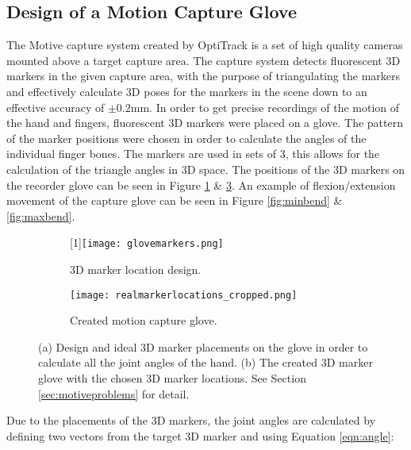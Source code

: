 \documentclass[../main.tex]{subfiles}
\begin{document}
\subsection{Design of a Motion Capture Glove}
\label{sec:motiveglove}

The Motive capture system created by OptiTrack \cite{motive} is a set of high quality cameras mounted above a target capture area.
The capture system detects fluorescent 3D markers in the given capture area, with the purpose of triangulating the markers and effectively calculate 3D poses for the markers in the scene down to an effective accuracy of $\pm 0.2$mm.
In order to get precise recordings of the motion of the hand and fingers, fluorescent 3D markers were placed on a glove.
The pattern of the marker positions were chosen in order to calculate the angles of the individual finger bones.
The markers are used in sets of 3, this allows for the calculation of the triangle angles in 3D space.
The positions of the 3D markers on the recorder glove can be seen in Figure \ref{fig:markerdesign} \& \ref{fig:realmarkers}.
An example of \gls{flexion/extension} movement of the capture glove can be seen in Figure \ref{fig:minbend} \& \ref{fig:maxbend}.


\begin{figure}[H]
    \centering
    \begin{subfigure}[b]{0.49\textwidth}
        \centering
        \scalebox{-1}[1]{\texttt{[image: glovemarkers.png]}}
        \caption{3D marker location design.}
        \label{fig:markerdesign}
    \end{subfigure}
    \hfill
    \centering
    \begin{subfigure}[b]{0.49\textwidth}
        \centering
        \texttt{[image: realmarkerlocations\_cropped.png]}
        \caption{Created motion capture glove.}
        \label{fig:realmarkers}
    \end{subfigure}
    \caption{(a) Design and ideal 3D marker placements on the glove in order to calculate all the joint angles of the hand. (b) The created 3D marker glove with the chosen 3D marker locations. See Section \ref{sec:motiveproblems} for detail.}
\end{figure}

Due to the placements of the 3D markers, the joint angles are calculated by defining two vectors from the target 3D marker and using Equation \eqref{eqn:angle}:
\end{document}
